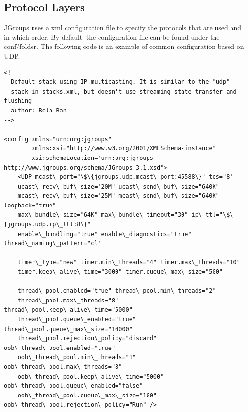 \documentclass[a4paper,10pt]{report}
\begin{document}
\subsection{Protocol Layers}
JGroups uses a xml configuration file to specify the protocols that are used and in which order. By default, the configuration file can be found under the conf/folder. The following code is an example of common configuration based on UDP.
\lstset{language=XML}
\lstset{commentstyle=\textit}
\begin{lstlisting}
<!--
  Default stack using IP multicasting. It is similar to the "udp"
  stack in stacks.xml, but doesn't use streaming state transfer and flushing
  author: Bela Ban
-->

<config xmlns="urn:org:jgroups"
        xmlns:xsi="http://www.w3.org/2001/XMLSchema-instance"
        xsi:schemaLocation="urn:org:jgroups http://www.jgroups.org/schema/JGroups-3.1.xsd">
    <UDP mcast\_port="\$\{jgroups.udp.mcast\_port:45588\}" tos="8"
    ucast\_recv\_buf\_size="20M" ucast\_send\_buf\_size="640K"
    mcast\_recv\_buf\_size="25M" mcast\_send\_buf\_size="640K" loopback="true"
    max\_bundle\_size="64K" max\_bundle\_timeout="30" ip\_ttl="\$\{jgroups.udp.ip\_ttl:8\}"
    enable\_bundling="true" enable\_diagnostics="true" thread\_naming\_pattern="cl"

    timer\_type="new" timer.min\_threads="4" timer.max\_threads="10"
    timer.keep\_alive\_time="3000" timer.queue\_max\_size="500"

    thread\_pool.enabled="true" thread\_pool.min\_threads="2"
    thread\_pool.max\_threads="8" thread\_pool.keep\_alive\_time="5000"
    thread\_pool.queue\_enabled="true" thread\_pool.queue\_max\_size="10000"
    thread\_pool.rejection\_policy="discard" oob\_thread\_pool.enabled="true"
    oob\_thread\_pool.min\_threads="1" oob\_thread\_pool.max\_threads="8"
    oob\_thread\_pool.keep\_alive\_time="5000" oob\_thread\_pool.queue\_enabled="false"
    oob\_thread\_pool.queue\_max\_size="100" oob\_thread\_pool.rejection\_policy="Run" />


\end{lstlisting}
\end{document}
